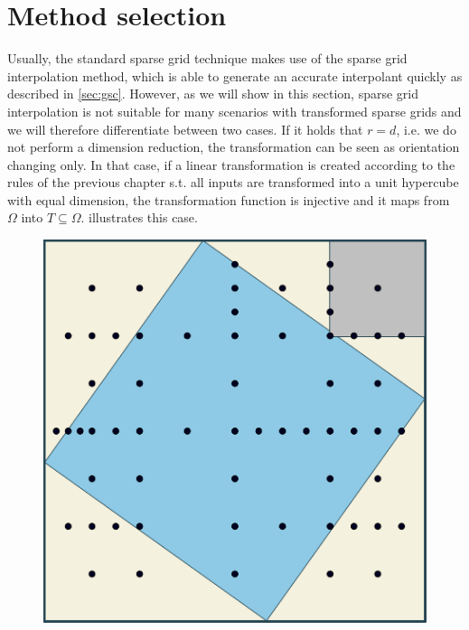 \documentclass[
  a4paper,  %
  twoside,  %
  bibliography=totoc,
  headsepline,
  cleardoublepage=empty,
  parskip=half,
  draft=false
]{scrbook}
\begin{document}
\section{Method selection}
\label{sec:ms}

Usually, the standard sparse grid technique makes use of the sparse grid interpolation method, which is able to generate an accurate interpolant quickly as described in \cref{sec:gsc}.
However, as we will show in this section, sparse grid interpolation is not suitable for many scenarios with transformed sparse grids and we will therefore differentiate between two cases.
If it holds that $r=d$, i.e. we do not perform a dimension reduction, the transformation can be seen as orientation changing only.
In that case, if a linear transformation is created according to the rules of the previous chapter s.t. all inputs are transformed into a unit hypercube with equal dimension, the transformation function is injective and it maps from $\Omega$ into $T \subseteq \Omega$.
 illustrates this case.

\begin{mdframed}[style=style]
\begin{figure}[H]
        \centering
\begin{minipage}{.49\textwidth}
        \centering
\label{fig:aligned_grid}
    \end{minipage}%
    \begin{minipage}{0.49\textwidth}
        \centering
   \includegraphics[width=0.8\linewidth]{graphics/aligned_grid}
    \end{minipage}
\end{figure}
\end{mdframed}
\end{document}
